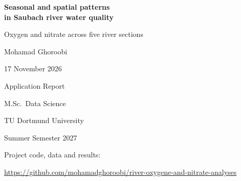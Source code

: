 \documentclass[12pt,a4paper]{article}
\begin{document}
\thispagestyle{empty}
\vspace*{30mm}
\begin{center}
{\LARGE\bfseries Seasonal and spatial patterns\\[5pt]
in Saubach river water quality\par}
\vspace{12mm}
{\large Oxygen and nitrate across five river sections\par}
\vspace{25mm}
{\Large Mohamad Ghoroobi\par}
\vspace{8mm}
17 November 2026\par
\vspace{25mm}
Application Report\par
M.Sc.\ Data Science\par
TU Dortmund University\par
Summer Semester 2027\par
\vspace{18mm}
\small Project code, data and results:\par
\url{https://github.com/mohamadghoroobi/river-oxygene-and-nitrate-analyses}
\end{center}
\clearpage

\begingroup
\singlespacing
\tableofcontents
\endgroup
\clearpage


\clearpage

\clearpage

\clearpage

\clearpage

\clearpage

\clearpage

\clearpage

\end{document}
